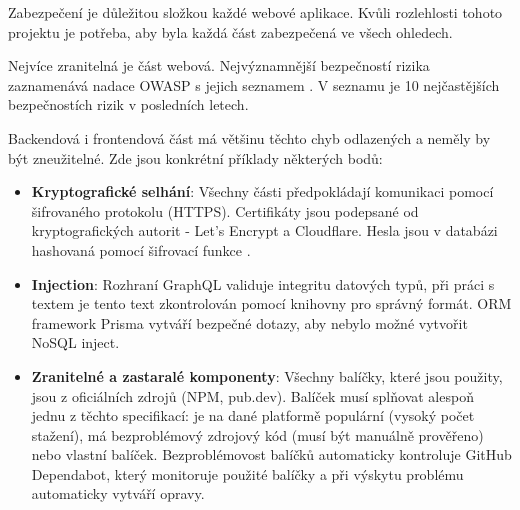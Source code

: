 Zabezpečení je důležitou složkou každé webové aplikace. Kvůli rozlehlosti tohoto projektu je potřeba, aby byla každá část zabezpečená ve všech ohledech.\par
Nejvíce zranitelná je část webová. Nejvýznamnější bezpečností rizika zaznamenává nadace OWASP\cite{OWASP} s jejich seznamem \cite{OWASP-top-ten}. V seznamu je 10 nejčastějších bezpečnostích rizik v posledních letech.\par
Backendová i frontendová část má většinu těchto chyb odlazených a neměly by být zneužitelné. Zde jsou konkrétní příklady některých bodů:
\begin{itemize}
	\item \textbf{Kryptografické selhání}\cite{CryptographicFailures}: Všechny části předpokládají komunikaci pomocí šifrovaného protokolu (HTTPS). Certifikáty jsou podepsané od kryptografických autorit - Let's Encrypt a Cloudflare. Hesla jsou v databázi hashovaná pomocí šifrovací funkce \cite{bcrypt}.
	\item \textbf{Injection}\cite{Injection}: Rozhraní GraphQL validuje integritu datových typů, při práci s textem je tento text zkontrolován pomocí knihovny \cite{Validator} pro správný formát. ORM framework Prisma vytváří bezpečné dotazy, aby nebylo možné vytvořit NoSQL inject.
	\item \textbf{Zranitelné a zastaralé komponenty}\cite{VulnerableAndOutdatedComponents}: Všechny balíčky, které jsou použity, jsou z oficiálních zdrojů (NPM, pub.dev). Balíček musí splňovat alespoň jednu z těchto specifikací: je na dané platformě populární (vysoký počet stažení), má bezproblémový zdrojový kód (musí být manuálně prověřeno) nebo vlastní balíček. Bezproblémovost balíčků automaticky kontroluje GitHub Dependabot, který monitoruje použité balíčky a při výskytu problému automaticky vytváří opravy.
\end{itemize}
